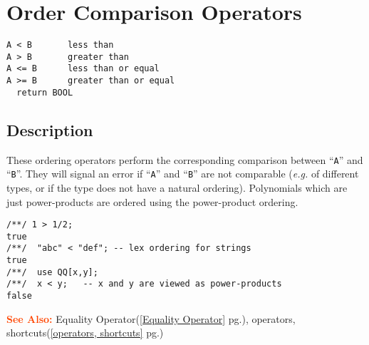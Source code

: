 \documentclass[a4paper]{mybook}
\newenvironment{command}{}{} %
\newcommand\SeeAlso{\par\textcolor{OrangeRed}{\textbf{\large See Also: }}}
\begin{document}
\section{Order Comparison Operators}
\label{Order Comparison Operators}
\begin{command} %


\begin{Verbatim}[label=syntax, rulecolor=\color{MidnightBlue},
frame=single]
A < B       less than
A > B       greater than
A <= B      less than or equal
A >= B      greater than or equal
  return BOOL
\end{Verbatim}


\subsection*{Description}

These ordering operators perform the corresponding comparison between
``\verb&A&'' and ``\verb&B&''.  They will signal an error if ``\verb&A&'' and ``\verb&B&'' are not comparable
(\textit{e.g.} of different types, or if the type does not have a natural
ordering).  Polynomials which are just power-products are ordered using
the power-product ordering.
\begin{Verbatim}[label=example, rulecolor=\color{PineGreen}, frame=single]
/**/ 1 > 1/2;
true
/**/  "abc" < "def"; -- lex ordering for strings
true
/**/  use QQ[x,y];
/**/  x < y;   -- x and y are viewed as power-products
false
\end{Verbatim}


\SeeAlso %
  Equality Operator(\ref{Equality Operator} pg.\pageref{Equality Operator}), 
    operators, shortcuts(\ref{operators, shortcuts} pg.\pageref{operators, shortcuts})
\end{command} %
\end{document}

